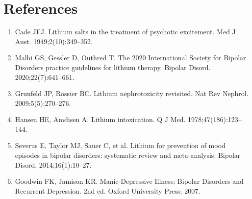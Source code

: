 \section*{References}
\begin{enumerate}
  \item Cade JFJ. Lithium salts in the treatment of psychotic excitement. Med J Aust. 1949;2(10):349--352.
  \item Malhi GS, Gessler D, Outhred T. The 2020 International Society for Bipolar Disorders practice guidelines for lithium therapy. Bipolar Disord. 2020;22(7):641--661.
  \item Grunfeld JP, Rossier BC. Lithium nephrotoxicity revisited. Nat Rev Nephrol. 2009;5(5):270--276.
  \item Hansen HE, Amdisen A. Lithium intoxication. Q J Med. 1978;47(186):123--144.
  \item Severus E, Taylor MJ, Sauer C, et al. Lithium for prevention of mood episodes in bipolar disorders: systematic review and meta-analysis. Bipolar Disord. 2014;16(1):10--27.
  \item Goodwin FK, Jamison KR. Manic-Depressive Illness: Bipolar Disorders and Recurrent Depression. 2nd ed. Oxford University Press; 2007.
\end{enumerate}

\clearpage
